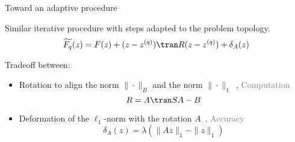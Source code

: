 \documentclass[ignorenonframetext]{beamer}
\def\keypoint#1{\hfill\textcolor{gray}{#1}}
\begin{document}
\begin{frame}{Toward an adaptive procedure}
	

	Similar iterative procedure with steps adapted to the problem topology.\\[1em]
	\[
		\widetilde{F_q}(z) = F(z) + (z-z^{(q)})\tran R(z-z^{(q)}) + \delta_A(z)
	\]


	Tradeoff between:\\[.3em]
	\begin{itemize}\itemsep1em
		\item Rotation to align the norm $\|\cdot\|_B$ and the norm $\|\cdot\|_1$~,
		\keypoint{Computation}
		\[ R = A\tran SA - B\]
		\item Deformation of the $\ell_1$-norm with the rotation $A$~.
		\keypoint{Accuracy}
		\[ \delta_A(z) = \lambda\left(\|Az\|_1-\|z\|_1\right) \]
	\end{itemize}
	
\end{frame}


\end{document}
